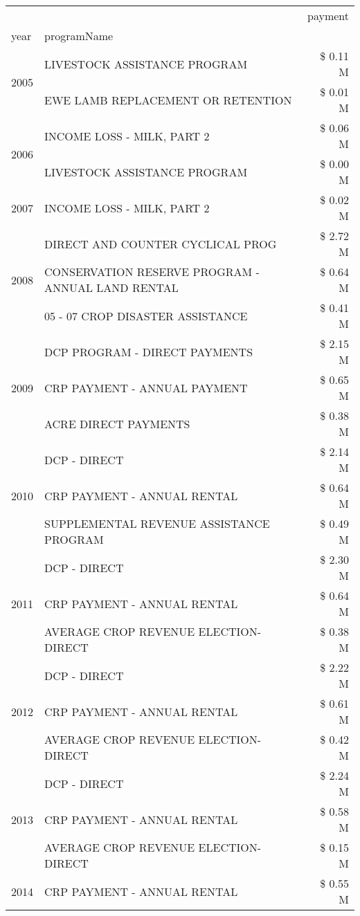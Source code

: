 \begin{tabular}{llr}
\toprule
 &  & payment \\
year & programName &  \\
\midrule
\multirow[t]{2}{*}{2005} & LIVESTOCK ASSISTANCE PROGRAM & \$ 0.11 M \\
 & EWE LAMB REPLACEMENT OR RETENTION & \$ 0.01 M \\
\cline{1-3}
\multirow[t]{2}{*}{2006} & INCOME LOSS - MILK, PART 2 & \$ 0.06 M \\
 & LIVESTOCK ASSISTANCE PROGRAM & \$ 0.00 M \\
\cline{1-3}
2007 & INCOME LOSS - MILK, PART 2 & \$ 0.02 M \\
\cline{1-3}
\multirow[t]{3}{*}{2008} & DIRECT AND COUNTER CYCLICAL PROG & \$ 2.72 M \\
 & CONSERVATION RESERVE PROGRAM - ANNUAL LAND RENTAL & \$ 0.64 M \\
 & 05 - 07 CROP DISASTER ASSISTANCE & \$ 0.41 M \\
\cline{1-3}
\multirow[t]{3}{*}{2009} & DCP PROGRAM - DIRECT PAYMENTS & \$ 2.15 M \\
 & CRP PAYMENT - ANNUAL PAYMENT & \$ 0.65 M \\
 & ACRE DIRECT PAYMENTS & \$ 0.38 M \\
\cline{1-3}
\multirow[t]{3}{*}{2010} & DCP - DIRECT & \$ 2.14 M \\
 & CRP PAYMENT - ANNUAL RENTAL & \$ 0.64 M \\
 & SUPPLEMENTAL REVENUE ASSISTANCE PROGRAM & \$ 0.49 M \\
\cline{1-3}
\multirow[t]{3}{*}{2011} & DCP - DIRECT & \$ 2.30 M \\
 & CRP PAYMENT - ANNUAL RENTAL & \$ 0.64 M \\
 & AVERAGE CROP REVENUE ELECTION-DIRECT & \$ 0.38 M \\
\cline{1-3}
\multirow[t]{3}{*}{2012} & DCP - DIRECT & \$ 2.22 M \\
 & CRP PAYMENT - ANNUAL RENTAL & \$ 0.61 M \\
 & AVERAGE CROP REVENUE ELECTION-DIRECT & \$ 0.42 M \\
\cline{1-3}
\multirow[t]{3}{*}{2013} & DCP - DIRECT & \$ 2.24 M \\
 & CRP PAYMENT - ANNUAL RENTAL & \$ 0.58 M \\
 & AVERAGE CROP REVENUE ELECTION-DIRECT & \$ 0.15 M \\
\cline{1-3}
\multirow[t]{3}{*}{2014} & CRP PAYMENT - ANNUAL RENTAL & \$ 0.55 M \\

\end{tabular}
